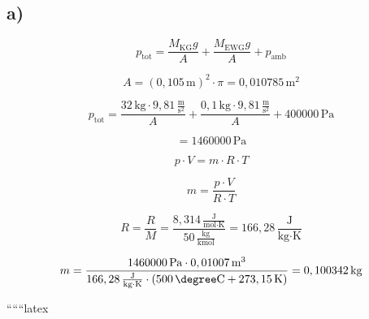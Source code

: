 

\subsection*{a)}

\[
p_{\text{tot}} = \frac{M_{\text{KG}} g}{A} + \frac{M_{\text{EWG}} g}{A} + p_{\text{amb}}
\]

\[
A = (0,105\, \text{m})^2 \cdot \pi = 0,010785\, \text{m}^2
\]

\[
p_{\text{tot}} = \frac{32\, \text{kg} \cdot 9,81\, \frac{\text{m}}{\text{s}^2}}{A} + \frac{0,1\, \text{kg} \cdot 9,81\, \frac{\text{m}}{\text{s}^2}}{A} + 400000\, \text{Pa}
\]

\[
= 1460000\, \text{Pa}
\]

\[
p \cdot V = m \cdot R \cdot T
\]

\[
m = \frac{p \cdot V}{R \cdot T}
\]

\[
R = \frac{R}{M} = \frac{8,314\, \frac{\text{J}}{\text{mol} \cdot \text{K}}}{50\, \frac{\text{kg}}{\text{kmol}}} = 166,28\, \frac{\text{J}}{\text{kg} \cdot \text{K}}
\]

\[
m = \frac{1460000\, \text{Pa} \cdot 0,01007\, \text{m}^3}{166,28\, \frac{\text{J}}{\text{kg} \cdot \text{K}} \cdot (500\, \degree \text{C} + 273,15\, \text{K})} = 0,100342\, \text{kg}
\]

``````latex